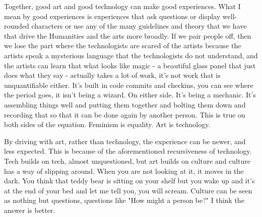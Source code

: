 Together, good art and good technology can make good experiences. What I mean by good experiences is experiences that ask questions or display well-rounded characters or use any of the many guidelines and theory that we have that drive the Humanities and the arts more broadly. If we pair people off, then we lose the part where the technologists are scared of the artists because the artists speak a mysterious language that the technologists do not understand, and the artists can learn that what looks like magic - a beautiful glass panel that just does what they say - actually takes a lot of work, it's not work that is unquantifiable either. It's built in code commits and checkins, you can see where the period goes, it isn't being a wizard. On either side. It's being a mechanic. It's assembling things well and putting them together and bolting them down and recording that so that it can be done again by another person. This is true on both sides of the equation. Feminism is equality. Art is technology. 

By driving with art, rather than technology, the experience can be newer, and less expected. This is because of the aforementioned recursiveness of technology. Tech builds on tech, almost unquestioned, but art builds on culture and culture has a way of slipping around. When you are not looking at it, it moves in the dark. You think that teddy bear is sitting on your shelf but you wake up and it's at the end of your bed and let me tell you, you will scream. Culture can be seen as nothing but questions, questions like "How might a person be?" I think the answer is better. 